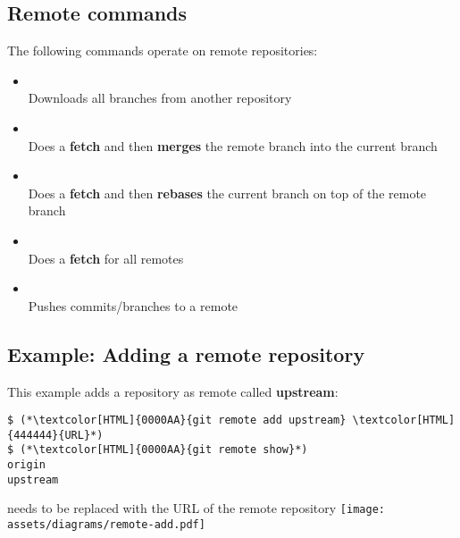 \subsection{Remote commands}
\begin{frame}[fragile]
  \subslidetitle
  The following commands operate on remote repositories:
  \begin{itemize}
    \item {} \\
      Downloads all branches from another repository
    \item {} \\
      Does a {\bf fetch} and then {\bf merges} the remote branch into the current branch
    \item {} \\
      Does a {\bf fetch} and then {\bf rebases} the current branch on top of the remote branch
    \item {} \\
      Does a {\bf fetch} for all remotes
    \item {} \\
      Pushes commits/branches to a remote
  \end{itemize}
\end{frame}

\subsection{Example: Adding a remote repository}
\begin{frame}[fragile]
  \subslidetitle
  This example adds a repository as remote called \textbf{upstream}:
  \begin{lstlisting}
$ (*\textcolor[HTML]{0000AA}{git remote add upstream} \textcolor[HTML]{444444}{URL}*)
$ (*\textcolor[HTML]{0000AA}{git remote show}*)
origin
upstream
\end{lstlisting}
\vspace{1em}
 needs to be replaced with the URL of the remote repository
\vspace{1em}
\center \texttt{[image: assets/diagrams/remote-add.pdf]}
\end{frame}

